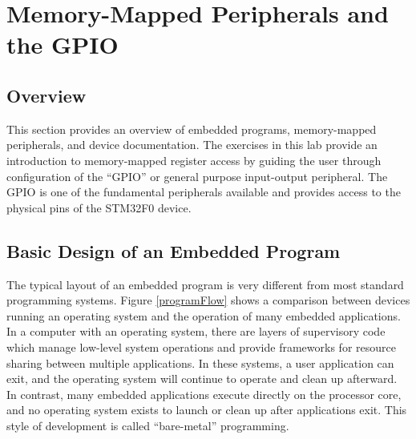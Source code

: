 \documentclass[11pt,fleqn]{book} %
\begin{document}




\chapter{Memory-Mapped Peripherals and the GPIO}

\section{Overview}
This section provides an overview of embedded programs, memory-mapped peripherals, and device documentation. The exercises in this lab provide an introduction to memory-mapped register access by guiding the user through configuration of the ``GPIO'' or general purpose input-output peripheral. The GPIO is one of the fundamental peripherals available and provides access to the physical pins of the STM32F0 device. 


\section{Basic Design of an Embedded Program}


The typical layout of an embedded program is very different from most standard programming systems. Figure \vref{programFlow} shows a comparison between devices running an operating system and the operation of many embedded applications. 
In a computer with an operating system, there are layers of supervisory code which manage low-level system operations and provide frameworks for resource sharing between multiple applications. In these systems, a user application can exit, and the operating system will continue to operate and clean up afterward. In contrast, many embedded applications execute directly on the processor core, and no operating system exists to launch or clean up after applications exit. This style of development is called ``bare-metal'' programming. 
\end{document}
